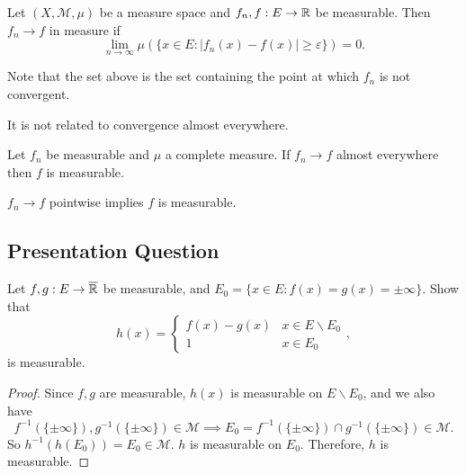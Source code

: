 \documentclass[class=book, crop=false]{standalone}
\begin{document}
        \begin{definition}
            Let $(X, \mathcal{M}, \mu)$ be a measure space and $f_n, f : E \rightarrow \mathbb{R}$ be measurable. Then $f_n \rightarrow f$ in measure if
            \begin{equation*}
                \lim_{n \rightarrow \infty} \mu(\{x \in E : |f_n(x) - f(x)| \geq \varepsilon\}) = 0.
            \end{equation*}
        \end{definition}
        \begin{remark}
            Note that the set above is the set containing the point at which $f_n$ is not convergent.
        \end{remark}
        \begin{remark}
            It is not related to convergence almost everywhere.
        \end{remark}

        \begin{theorem}
            Let $f_n$ be measurable and $\mu$ a complete measure. If $f_n \rightarrow f$ almost everywhere then $f$ is measurable.
        \end{theorem}
        \begin{corollary}
            $f_n \rightarrow f$ pointwise implies $f$ is measurable.
        \end{corollary}
        
        \subsection{Presentation Question}
        \begin{question}
            Let $f, g : E \rightarrow \overline{\mathbb{R}}$ be measurable, and $E_0 = \{x \in E : f(x) = g(x) = \pm\infty\}$. Show that
            \begin{equation*}
                h(x) = \begin{cases}
                    f(x) - g(x) & x \in E \backslash E_0 \\
                    1 & x \in E_0
                \end{cases},
            \end{equation*}
            is measurable.
        \end{question}

        \begin{proof}
            Since $f, g$ are measurable, $h(x)$ is measurable on $E \backslash E_0$, and we also have
            \begin{equation*}
                f^{-1}(\{\pm \infty\}), g^{-1}(\{\pm\infty\}) \in \mathcal{M} \implies E_0 = f^{-1}(\{\pm \infty\}) \cap g^{-1}(\{\pm\infty\}) \in \mathcal{M}.
            \end{equation*}
            So $h^{-1}(h(E_0)) = E_0 \in \mathcal{M}$. $h$ is measurable on $E_0$. Therefore, $h$ is measurable.
        \end{proof}
\end{document}
